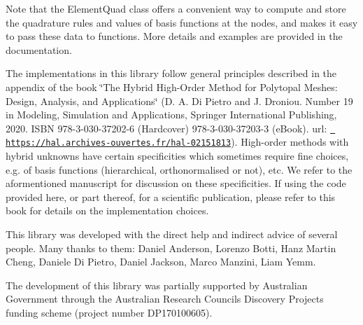 \begin{DoxyCode}{0}
\end{DoxyCode}


Note that the {\ttfamily Element\+Quad} class offers a convenient way to compute and store the quadrature rules and values of basis functions at the nodes, and makes it easy to pass these data to functions. More details and examples are provided in the documentation.

The implementations in this library follow general principles described in the appendix of the book \char`\"{}\+The Hybrid High-\/\+Order Method for Polytopal Meshes\+: Design, Analysis, and Applications\char`\"{} (D. A. Di Pietro and J. Droniou. Number 19 in Modeling, Simulation and Applications, Springer International Publishing, 2020. I\+S\+BN 978-\/3-\/030-\/37202-\/6 (Hardcover) 978-\/3-\/030-\/37203-\/3 (e\+Book). url\+: \href{https://hal.archives-ouvertes.fr/hal-02151813}{\texttt{ https\+://hal.\+archives-\/ouvertes.\+fr/hal-\/02151813}}). High-\/order methods with hybrid unknowns have certain specificities which sometimes require fine choices, e.\+g. of basis functions (hierarchical, orthonormalised or not), etc. We refer to the aformentioned manuscript for discussion on these specificities. If using the code provided here, or part thereof, for a scientific publication, please refer to this book for details on the implementation choices.

This library was developed with the direct help and indirect advice of several people. Many thanks to them\+: Daniel Anderson, Lorenzo Botti, Hanz Martin Cheng, Daniele Di Pietro, Daniel Jackson, Marco Manzini, Liam Yemm.

The development of this library was partially supported by Australian Government through the Australian Research Council\textquotesingle{}s Discovery Projects funding scheme (project number D\+P170100605). 